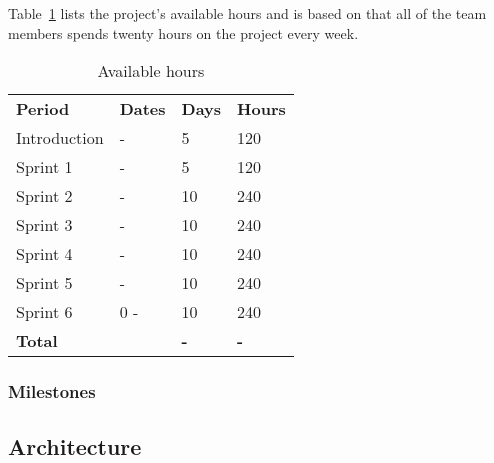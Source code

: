  
 Table~\ref{tab:availHours} lists the project's available hours and is based on that all of the team members spends twenty hours on the project every week.

\begin{table}[H]
\centering
{}
\begin{tabular}{llll}
\textbf{Period} & \textbf{Dates} & \textbf{Days} & \textbf{Hours}\\
Introduction& - &5  & 120 \\
Sprint 1& - & 5  & 120 \\
Sprint 2 & - &10  & 240 \\
Sprint 3 & - &10 & 240 \\
Sprint 4 & -&10  &240 \\
Sprint 5 & - &10&  240 \\
Sprint 6 &0 - &10  &240 \\
\textbf{Total}&& \textbf{-}&  \textbf{-}
\end{tabular}
\caption{Available hours}
\label{tab:availHours}
\end{table}

\subsubsection{Milestones}
\subsection{Architecture}